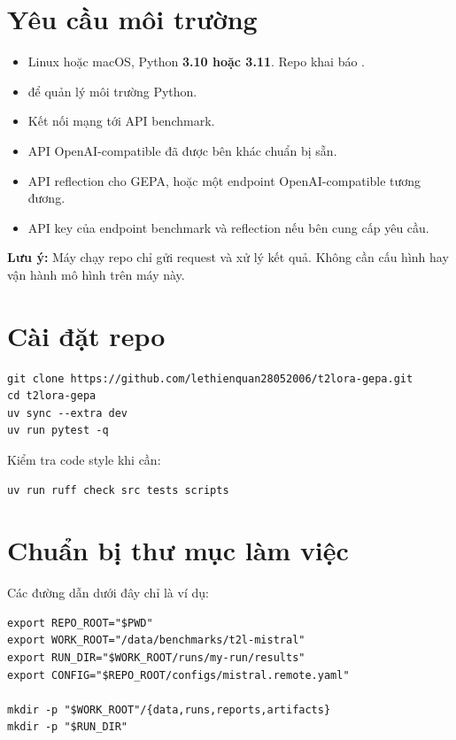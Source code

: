 \documentclass[11pt,a4paper]{article}
\newcommand{\code}[1]{\texttt{\detokenize{#1}}}
\newcommand{\Important}[1]{%
  \par\smallskip\noindent
  \colorbox{warnbg}{\parbox{\dimexpr\linewidth-2\fboxsep\relax}{%
    \raggedright\textcolor{warn}{\textbf{Lưu ý:}} #1}}\par\smallskip}
\begin{document}
\section{Yêu cầu môi trường}

\begin{itemize}
  \item Linux hoặc macOS, Python \textbf{3.10 hoặc 3.11}. Repo khai báo \code{>=3.10,<3.12}.
  \item \code{uv} để quản lý môi trường Python.
  \item Kết nối mạng tới API benchmark.
  \item API OpenAI-compatible đã được bên khác chuẩn bị sẵn.
  \item API reflection cho GEPA, hoặc một endpoint OpenAI-compatible tương đương.
  \item API key của endpoint benchmark và reflection nếu bên cung cấp yêu cầu.
\end{itemize}

\Important{Máy chạy repo chỉ gửi request và xử lý kết quả. Không cần cấu hình hay vận hành mô hình trên máy này.}

\section{Cài đặt repo}

\begin{lstlisting}
git clone https://github.com/lethienquan28052006/t2lora-gepa.git
cd t2lora-gepa
uv sync --extra dev
uv run pytest -q
\end{lstlisting}

Kiểm tra code style khi cần:

\begin{lstlisting}
uv run ruff check src tests scripts
\end{lstlisting}

\section{Chuẩn bị thư mục làm việc}

Các đường dẫn dưới đây chỉ là ví dụ:

\begin{lstlisting}
export REPO_ROOT="$PWD"
export WORK_ROOT="/data/benchmarks/t2l-mistral"
export RUN_DIR="$WORK_ROOT/runs/my-run/results"
export CONFIG="$REPO_ROOT/configs/mistral.remote.yaml"

mkdir -p "$WORK_ROOT"/{data,runs,reports,artifacts}
mkdir -p "$RUN_DIR"
\end{lstlisting}
\end{document}
